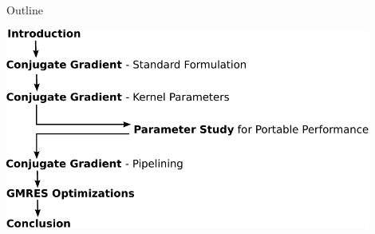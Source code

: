 

%
%

\begin{frame}{Outline}
 \begin{center}
  \includegraphics[width=0.9\textwidth]{figures/outline}
 \end{center}
\end{frame}



%
%


%
%



%
%



%
%



